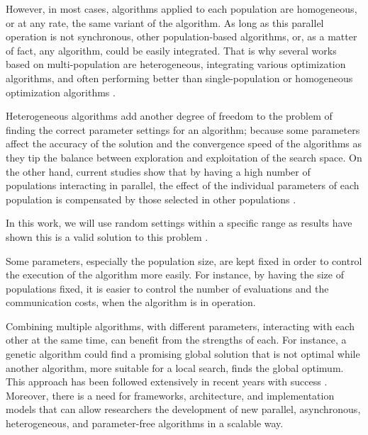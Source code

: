\documentclass[review]{elsarticle}
\begin{document}
However, in most cases, algorithms applied to each population are
homogeneous, or at any rate, the same variant of the algorithm. As long as this
parallel operation is not synchronous, other population-based algorithms, or, as
a matter of fact, any algorithm, could be easily integrated. That is why several
works based on multi-population are heterogeneous, integrating various
optimization algorithms, and often performing better than single-population or
homogeneous optimization algorithms \cite{wu2016differential,nseef2016adaptive}.

Heterogeneous algorithms add another degree of freedom to the problem of finding
the correct parameter settings for an algorithm; because some parameters affect
the accuracy of the solution and the convergence speed of the algorithms as they
tip the balance between exploration and exploitation of the search space. On the
other hand, current studies show that by having a high number of populations
interacting in parallel, the effect of the individual parameters of each
population is compensated by those selected in other
populations \cite{li2016multi,tanabe2013evaluation}. %

In this work, we will use random settings within a specific range as results have shown
this is a valid solution to this problem \cite{garcia2014randomized}. %

Some parameters, especially the population size, are
kept fixed in order to control the execution of the algorithm more easily. For
instance, by having the size of populations fixed, it is easier to control
the number of evaluations and the communication costs, when the algorithm is in
operation. %

Combining multiple algorithms, with different parameters, interacting with each
other at the same time, can benefit from the strengths of each. For instance, a
genetic algorithm could find a promising global solution that is not optimal
while another algorithm, more suitable for a local search, finds the global
optimum. This approach has been followed extensively in recent years with
success \cite{li2015multi,godio2016multi,biswas2014co}. 
Moreover, there is a need for frameworks, architecture, and
implementation models that can allow researchers the development of new
parallel, asynchronous, heterogeneous, and parameter-free algorithms in a scalable way.  
\end{document}
